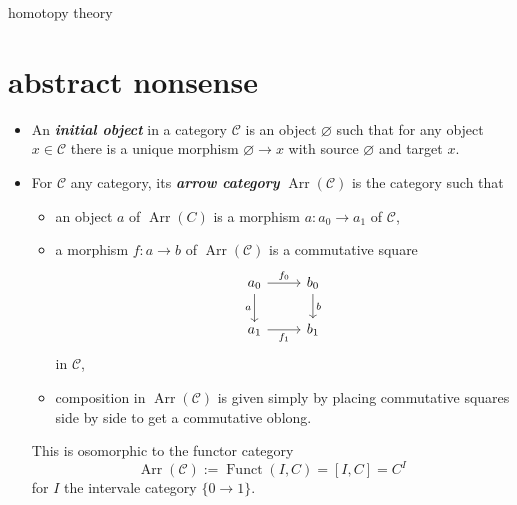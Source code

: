 \documentclass{article}
\numberwithin{equation}{section}
\newcommand{\Cc}{\mathcal{C}}
\DeclareMathOperator{\Arr}{Arr}
\DeclareMathOperator{\Funct}{Funct}
\begin{document}
{\Huge homotopy theory}
\tableofcontents
\section{abstract nonsense}
\begin{defn}\leavevmode
	\begin{itemize}
		\item An \textbf{\textit{initial object}} in a category $\Cc$ is an object $\varnothing$ such that for any object $x\in\Cc$ there is a unique morphism $\varnothing\to x$ with source $\varnothing$ and target $x$.
		
		\item \label{defn:arrow-cat}
		 For $\Cc$ any category, its \textbf{\textit{arrow category}} $\Arr(\Cc)$ is the category such that
		\begin{itemize}
			\item an object $a$ of $\Arr(C)$ is a morphism $a:a_0\to a_1$ of $\Cc$,
			\item a morphism $f:a\to b$ of $\Arr(\Cc)$ is a commutative square
			\[\begin{tikzcd}
				a_0\arrow[r,"f_0"]\arrow[d,swap,"a"]&b_0\arrow[d,"b"]\\
				a_1\arrow[r,swap,"f_1"]&b_1
			\end{tikzcd}\]
			in $\Cc$,
			\item composition in $\Arr(\Cc)$ is given simply by placing commutative squares side by side to get a commutative oblong.
		\end{itemize}
		This is osomorphic to the functor category
		\[\Arr(\Cc):=\Funct(I,C)=[I,C]=C^I\]
		for $I$ the intervale category $\{0\to 1\}$.
		

\end{itemize}
\end{defn}
\end{document}
